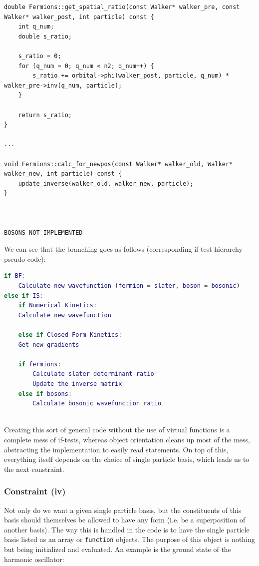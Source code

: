 \begin{lstlisting}
double Fermions::get_spatial_ratio(const Walker* walker_pre, const Walker* walker_post, int particle) const {
    int q_num;
    double s_ratio;

    s_ratio = 0;
    for (q_num = 0; q_num < n2; q_num++) {
        s_ratio += orbital->phi(walker_post, particle, q_num) * walker_pre->inv(q_num, particle);
    }

    return s_ratio;
}

...

void Fermions::calc_for_newpos(const Walker* walker_old, Walker* walker_new, int particle) const {
    update_inverse(walker_old, walker_new, particle);
}



BOSONS NOT IMPLEMENTED
\end{lstlisting}


We can see that the branching goes as follows (corresponding if-test hierarchy pseudo-code):

\begin{lstlisting}[language=Matlab]
if BF:
    Calculate new wavefunction (fermion = slater, boson = bosonic)
else if IS:
    if Numerical Kinetics:
	Calculate new wavefunction
	
    else if Closed Form Kinetics:
	Get new gradients 
	
	if fermions:
	    Calculate slater determinant ratio
	    Update the inverse matrix
	else if bosons:
	    Calculate bosonic wavefunction ratio
	
\end{lstlisting}

Creating this sort of general code without the use of virtual functions is a complete mess of if-tests, whereas object orientation cleans up most of the mess, abstracting the implementation to easily read statements. On top of this, everything itself depends on the choice of single particle basis, which leads us to the next constraint.

\subsubsection{Constraint (iv)}

Not only do we want a given single particle basis, but the constituents of this basis should themselves be allowed to have any form (i.e. be a superposition of another basis). The way this is handled in the code is to have the single particle basis listed as an array or \verb+function+ objects. The purpose of this object is nothing but being initialized and evaluated. An example is the ground state of the harmonic oscillator:


